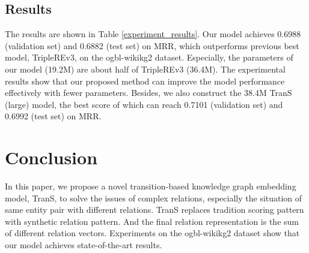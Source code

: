 \documentclass[11pt]{article}
\begin{document}
\subsection{Results}
The results are shown in Table \ref{experiment_results}. Our model achieves 0.6988 (validation set) and 0.6882 (test set) on MRR, which outperforms previous best model, TripleREv3, on the ogbl-wikikg2 dataset. Especially, the parameters of our model (19.2M) are about half of TripleREv3 (36.4M). The experimental results show that our proposed method can improve the model performance effectively with fewer parameters. Besides, we also construct the 38.4M TranS (large) model, the best score of which can reach 0.7101 (validation set) and 0.6992 (test set) on MRR.


\section{Conclusion}
In this paper, we propose a novel transition-based knowledge graph embedding model, TranS, to solve the issues of complex relations, especially the situation of same entity pair with different relations. TranS replaces tradition scoring pattern with synthetic relation pattern. And the final relation representation is the sum of different relation vectors. Experiments on the ogbl-wikikg2 dataset show that our model achieves  state-of-the-art results.



\end{document}
